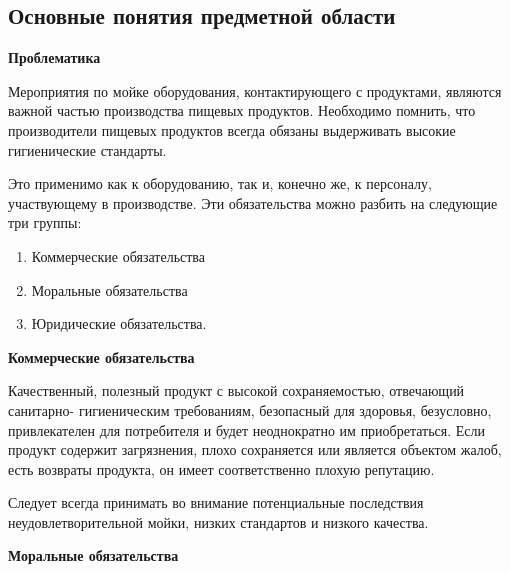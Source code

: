 \documentclass[a4paper,12pt,oneside]{extarticle}
\begin{document}
	\subsection{Основные понятия предметной области}
	
	\begin{flushleft}
		\bfseries Проблематика
	\end{flushleft}
	\begin{flushleft}
		Мероприятия по мойке оборудования, контактирующего с продуктами, являются важной частью производства пищевых продуктов. Необходимо помнить, что производители пищевых продуктов всегда обязаны выдерживать высокие гигиенические стандарты.
	\end{flushleft}
	
	\begin{flushleft}
		Это применимо как к оборудованию, так и, конечно же, к персоналу, участвующему	в производстве. Эти обязательства можно разбить на следующие три группы:
	\end{flushleft}
	
	\begin{enumerate}
		\item Коммерческие обязательства
		\item Моральные обязательства
		\item Юридические обязательства.
	\end{enumerate} 
	
	\begin{flushleft}
		\bfseries Коммерческие обязательства
	\end{flushleft}
	
	\begin{flushleft}
		Качественный, полезный продукт с высокой сохраняемостью, отвечающий санитарно-
		гигиеническим требованиям, безопасный для здоровья, безусловно, привлекателен для
		потребителя и будет неоднократно им приобретаться. Если продукт содержит загрязнения,
		плохо сохраняется или является объектом жалоб, есть возвраты продукта, он имеет
		соответственно плохую репутацию.
	\end{flushleft}
	
	\begin{flushleft}
		Следует всегда принимать во внимание потенциальные последствия
		неудовлетворительной мойки, низких стандартов и низкого качества.
	\end{flushleft}
	
	\begin{flushleft}
		\bfseries Моральные обязательства
	\end{flushleft}
	
\end{document}
